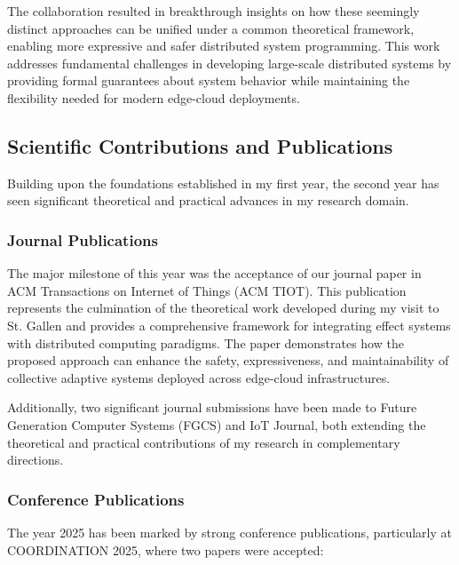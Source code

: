\documentclass[runningheads]{llncs}
\begin{document}
The collaboration resulted in breakthrough insights on how these seemingly distinct approaches can be unified under a common theoretical framework, enabling more expressive and safer distributed system programming. This work addresses fundamental challenges in developing large-scale distributed systems by providing formal guarantees about system behavior while maintaining the flexibility needed for modern edge-cloud deployments.

\subsection{Scientific Contributions and Publications}

Building upon the foundations established in my first year, the second year has seen significant theoretical and practical advances in my research domain.

\subsubsection{Journal Publications}

The major milestone of this year was the acceptance of our journal paper in ACM Transactions on Internet of Things (ACM TIOT). This publication represents the culmination of the theoretical work developed during my visit to St. Gallen and provides a comprehensive framework for integrating effect systems with distributed computing paradigms. The paper demonstrates how the proposed approach can enhance the safety, expressiveness, and maintainability of collective adaptive systems deployed across edge-cloud infrastructures.

Additionally, two significant journal submissions have been made to Future Generation Computer Systems (FGCS) and IoT Journal, both extending the theoretical and practical contributions of my research in complementary directions.

\subsubsection{Conference Publications}

The year 2025 has been marked by strong conference publications, particularly at COORDINATION 2025, where two papers were accepted:
\end{document}
